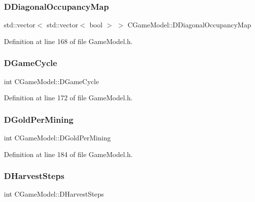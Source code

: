 \subsubsection{\texorpdfstring{D\+Diagonal\+Occupancy\+Map}{DDiagonalOccupancyMap}}
{\footnotesize\ttfamily std\+::vector$<$ std\+::vector$<$ bool $>$ $>$ C\+Game\+Model\+::\+D\+Diagonal\+Occupancy\+Map\hspace{0.3cm}{\ttfamily [protected]}}



Definition at line 168 of file Game\+Model.\+h.

\hypertarget{classCGameModel_a80bf86a6c1d75229d5d0f441f6313a1c}{}\label{classCGameModel_a80bf86a6c1d75229d5d0f441f6313a1c} 
\subsubsection{\texorpdfstring{D\+Game\+Cycle}{DGameCycle}}
{\footnotesize\ttfamily int C\+Game\+Model\+::\+D\+Game\+Cycle\hspace{0.3cm}{\ttfamily [protected]}}



Definition at line 172 of file Game\+Model.\+h.

\hypertarget{classCGameModel_a886529fe17365373d28c2881fdaa21f0}{}\label{classCGameModel_a886529fe17365373d28c2881fdaa21f0} 
\subsubsection{\texorpdfstring{D\+Gold\+Per\+Mining}{DGoldPerMining}}
{\footnotesize\ttfamily int C\+Game\+Model\+::\+D\+Gold\+Per\+Mining\hspace{0.3cm}{\ttfamily [protected]}}



Definition at line 184 of file Game\+Model.\+h.

\hypertarget{classCGameModel_a719733742e1340921a12efce992b07fe}{}\label{classCGameModel_a719733742e1340921a12efce992b07fe} 
\subsubsection{\texorpdfstring{D\+Harvest\+Steps}{DHarvestSteps}}
{\footnotesize\ttfamily int C\+Game\+Model\+::\+D\+Harvest\+Steps\hspace{0.3cm}{\ttfamily [protected]}}



